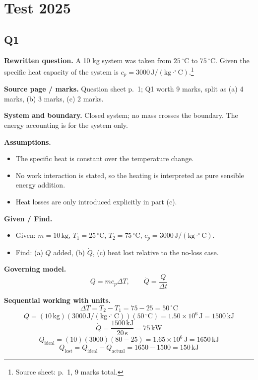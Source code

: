 \section*{Test 2025}

\subsection*{Q1}
\textbf{Rewritten question.} A 10 kg system was taken from $25\,^\circ\mathrm{C}$ to $75\,^\circ\mathrm{C}$. Given the specific heat capacity of the system is $c_p = 3000\,\mathrm{J/(kg\cdot ^\circ C)}$.\footnote{Source sheet: p.~1, 9 marks total.}

\textbf{Source page / marks.} Question sheet p.~1; Q1 worth 9 marks, split as (a) 4 marks, (b) 3 marks, (c) 2 marks.

\textbf{System and boundary.} Closed system; no mass crosses the boundary. The energy accounting is for the system only.

\textbf{Assumptions.}
\begin{itemize}
  \item The specific heat is constant over the temperature change.
  \item No work interaction is stated, so the heating is interpreted as pure sensible energy addition.
  \item Heat losses are only introduced explicitly in part (c).
\end{itemize}

\textbf{Given / Find.}
\begin{itemize}
  \item Given: $m=10\,\mathrm{kg}$, $T_1=25\,^\circ\mathrm{C}$, $T_2=75\,^\circ\mathrm{C}$, $c_p=3000\,\mathrm{J/(kg\cdot ^\circ C)}$.
  \item Find: (a) $Q$ added, (b) $\dot Q$, (c) heat lost relative to the no-loss case.
\end{itemize}

\textbf{Governing model.}
\[
Q = mc_p\Delta T,\qquad \dot Q = \frac{Q}{\Delta t}
\]

\textbf{Sequential working with units.}
\[
\Delta T = T_2-T_1 = 75-25 = 50\,^\circ\mathrm{C}
\]
\[
Q = (10\,\mathrm{kg})(3000\,\mathrm{J/(kg\cdot ^\circ C)})(50\,^\circ\mathrm{C})
= 1.50\times 10^6\,\mathrm{J} = 1500\,\mathrm{kJ}
\]
\[
\dot Q = \frac{1500\,\mathrm{kJ}}{20\,\mathrm{s}} = 75\,\mathrm{kW}
\]
\[
Q_{\text{ideal}} = (10)(3000)(80-25)=1.65\times 10^6\,\mathrm{J}=1650\,\mathrm{kJ}
\]
\[
Q_{\text{lost}} = Q_{\text{ideal}}-Q_{\text{actual}} = 1650-1500 = 150\,\mathrm{kJ}
\]

